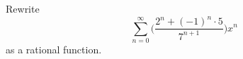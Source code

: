 Rewrite
\[
\sum_{n=0}^\infty \biggl( \frac{2^n + (-1)^n \cdot 5}{7^{n+1}}  \biggr) x^n
\]
as a rational function.
